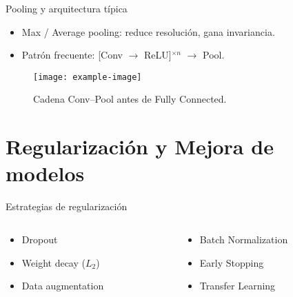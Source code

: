 \documentclass[12pt,spanish]{beamer}
\begin{document}
\begin{frame}{Pooling y arquitectura típica}
  \begin{itemize}
    \item Max / Average pooling: reduce resolución, gana invariancia.
    \item Patrón frecuente: [Conv $\rightarrow$ ReLU]$^{\times n}$ $\rightarrow$ Pool.
  \end{itemize}
  \begin{figure}
    \centering
    \texttt{[image: example-image]}
    \caption{Cadena Conv–Pool antes de Fully Connected.}
  \end{figure}
\end{frame}

\section{Regularización y Mejora de modelos}
\begin{frame}{Estrategias de regularización}
  \begin{columns}
    \begin{column}{0.5\textwidth}
      \begin{itemize}
        \item Dropout
        \item Weight decay ($L_2$)
        \item Data augmentation
      \end{itemize}
    \end{column}
    \begin{column}{0.5\textwidth}
      \begin{itemize}
        \item Batch Normalization
        \item Early Stopping
        \item Transfer Learning
      \end{itemize}
    \end{column}
  \end{columns}
\end{frame}

\end{document}
